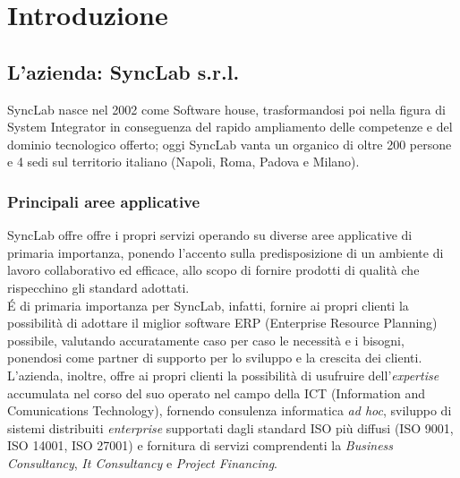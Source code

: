 
\chapter{Introduzione}
\label{cap:introduzione}






\section{L'azienda: SyncLab s.r.l.}
SyncLab nasce nel 2002 come Software house, trasformandosi poi nella figura di \gls{System Integrator} in conseguenza del rapido ampliamento delle competenze e del dominio tecnologico offerto; oggi SyncLab vanta un organico di oltre 200 persone e 4 sedi sul territorio italiano (Napoli, Roma, Padova e Milano).\\


\subsection{Principali aree applicative}
SyncLab offre offre i propri servizi operando su diverse aree applicative di primaria importanza, ponendo l'accento sulla predisposizione di un ambiente di lavoro collaborativo ed efficace, allo scopo di fornire prodotti di qualità che rispecchino gli standard adottati.\\
\'E di primaria importanza per SyncLab, infatti, fornire ai propri clienti la possibilità di adottare il miglior software \gls{ERP} (Enterprise Resource Planning) possibile, valutando accuratamente caso per caso le necessità e i bisogni, ponendosi come partner di supporto per lo sviluppo e la crescita dei clienti.\\
L'azienda, inoltre, offre ai propri clienti la possibilità di usufruire dell'\textit{expertise} accumulata nel corso del suo operato nel campo della \gls{ICT} (Information and Comunications Technology), fornendo consulenza informatica \textit{ad hoc}, sviluppo di sistemi distribuiti \textit{enterprise} supportati dagli standard ISO più diffusi (ISO 9001, ISO 14001, ISO 27001) e fornitura di servizi comprendenti la \textit{Business Consultancy}, \textit{It Consultancy} e \textit{Project Financing}.


